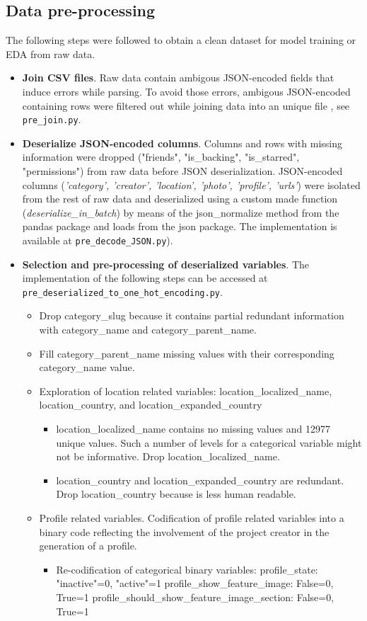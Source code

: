 \documentclass{article}
\begin{document}
\subsection{Data pre-processing}
\label{subsec:data_prepro}
The following steps were followed to obtain a clean dataset for model training or EDA from raw data.
\begin{itemize}
    \item \textbf{Join CSV files}.
Raw data contain ambigous JSON-encoded fields that induce errors while parsing. To avoid those errors, ambigous JSON-encoded containing rows were filtered out while joining data into an unique file , see {\tt pre\_join.py}.

    \item \textbf{Deserialize JSON-encoded columns}.
Columns and rows with missing information were dropped ("friends", "is\_backing", "is\_starred", "permissions") from raw data before JSON deserialization.
JSON-encoded columns (\emph{'category', 'creator', 'location', 'photo', 'profile', 'urls'}) were isolated from the rest of raw data and deserialized using a custom made function (\emph{deserialize\_in\_batch}) by means of the json\_normalize method from the pandas package and loads from the json package. The implementation is available at {\tt pre\_decode\_JSON.py}).

    \item \textbf{Selection and pre-processing of deserialized variables}.
    The implementation of the following steps can be accessed at {\tt pre\_deserialized\_to\_one\_hot\_encoding.py}.
    \begin{itemize}
 
        \item Drop category\_slug because it contains partial redundant information with category\_name and category\_parent\_name.
        \item Fill category\_parent\_name missing values with their corresponding category\_name value.
        \item Exploration of location related variables: location\_localized\_name, location\_country, and location\_expanded\_country
	\begin{itemize}
            \item location\_localized\_name contains no missing values and 12977 unique values. Such a number of levels for a categorical variable might not be informative. Drop location\_localized\_name.
            \item location\_country and location\_expanded\_country are redundant. Drop location\_country because is less human readable.
	\end{itemize}
	\item Profile related variables. Codification of profile related variables into a binary code reflecting the involvement of the project creator in the generation of a profile.
	\begin{itemize}
            \item Re-codification of categorical binary variables:
	    profile\_state: "inactive"=0, "active"=1
            profile\_show\_feature\_image: False=0, True=1
            profile\_should\_show\_feature\_image\_section: False=0, True=1


\end{itemize}
\end{itemize}
\end{itemize}
\end{document}
